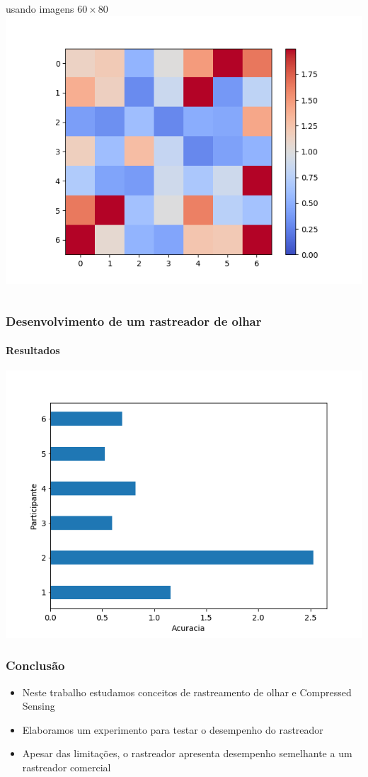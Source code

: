 \documentclass[11pt]{beamer}
\begin{document}
\begin{frame}
\begin{columns}[t]
\centering
\tiny{usando imagens $60 \times 80$}
\includegraphics[scale=.3]{imagens/erros3pyrDown.png}
\end{columns}
\end{frame}

\begin{frame}
\frametitle{Desenvolvimento de um rastreador de olhar}
\framesubtitle{Resultados}

\includegraphics[scale=.65]{imagens/errosParticipantes_pyrDown3.png}
\end{frame}

\begin{frame}
\frametitle{Conclusão}
\begin{itemize}
\item Neste trabalho estudamos conceitos de rastreamento de olhar e Compressed Sensing
\item Elaboramos um experimento para testar o desempenho do rastreador
\item Apesar das limitações, o rastreador apresenta desempenho semelhante a um rastreador comercial
\end{itemize}
\end{frame}
\end{document}
